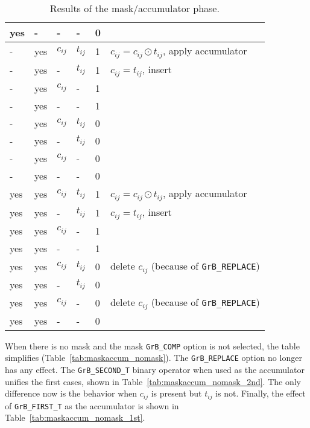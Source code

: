 \documentclass[12pt]{article}
\begin{document}
\begin{table}
{\begin{tabular}{lllll|l}
    yes&-   &  -       &  -        & 0    &   \\
\hline
    -  &yes & $c_{ij}$ & $t_{ij}$  & 1    &  $c_{ij} = c_{ij} \odot t_{ij}$, apply accumulator \\
    -  &yes &  -       & $t_{ij}$  & 1    &  $c_{ij} = t_{ij}$, insert \\
    -  &yes & $c_{ij}$ &  -        & 1    &   \\
    -  &yes &  -       &  -        & 1    &   \\
    -  &yes & $c_{ij}$ & $t_{ij}$  & 0    &   \\
    -  &yes &  -       & $t_{ij}$  & 0    &   \\
    -  &yes & $c_{ij}$ &  -        & 0    &   \\
    -  &yes &  -       &  -        & 0    &   \\
\hline
    yes&yes & $c_{ij}$ & $t_{ij}$  & 1    &  $c_{ij} = c_{ij} \odot t_{ij}$, apply accumulator \\
    yes&yes &  -       & $t_{ij}$  & 1    &  $c_{ij} = t_{ij}$, insert \\
    yes&yes & $c_{ij}$ &  -        & 1    &   \\
    yes&yes &  -       &  -        & 1    &   \\
    yes&yes & $c_{ij}$ & $t_{ij}$  & 0    &  delete $c_{ij}$  (because of \verb'GrB_REPLACE') \\
    yes&yes &  -       & $t_{ij}$  & 0    &   \\
    yes&yes & $c_{ij}$ &  -        & 0    &  delete $c_{ij}$  (because of \verb'GrB_REPLACE') \\
    yes&yes &  -       &  -        & 0    &   \\
\hline
\end{tabular}
}
\caption{Results of the mask/accumulator phase. \label{tab:maskaccum}}
\end{table}

When there is no mask and the mask \verb'GrB_COMP' option is not selected, the
table simplifies (Table~\ref{tab:maskaccum_nomask}).  The \verb'GrB_REPLACE'
option no longer has any effect.  The \verb'GrB_SECOND_T' binary operator when
used as the accumulator unifies the first cases, shown in
Table~\ref{tab:maskaccum_nomask_2nd}.  The only difference now is the behavior
when $c_{ij}$ is present but $t_{ij}$ is not.  Finally, the effect of
\verb'GrB_FIRST_T' as the accumulator is shown in
Table~\ref{tab:maskaccum_nomask_1st}.
\end{document}
